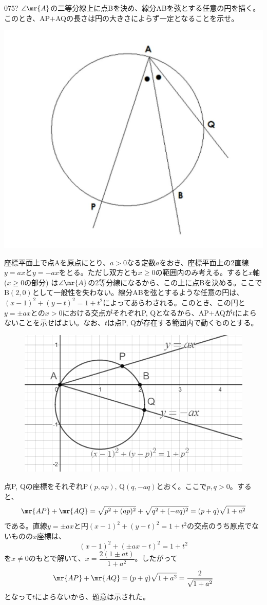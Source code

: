 \begin{thm}{075}{\hosi ?}{}
 $\angle\mr{A}$の二等分線上に点Bを決め、線分ABを弦とする任意の円を描く。このとき、AP$+$AQの長さは円の大きさによらず一定となることを示せ。
 \begin{center}
  \includegraphics[bb=0 0 1080 909,width=0.7\linewidth]{../problems/Q_075/Q_075.jpg}
 \end{center}
\end{thm}

座標平面上で点Aを原点にとり、$a>0$なる定数$a$をおき、座標平面上の2直線$y=ax$と$y=-ax$をとる。ただし双方とも$x\ge 0$の範囲内のみ考える。すると$x$軸 ($x\ge 0$の部分) は$\angle\mr{A}$の2等分線になるから、この上に点Bを決める。ここでB$(2,0)$として一般性を失わない。線分ABを弦とするような任意の円は、$(x-1)^2+(y-t)^2=1+t^2$によってあらわされる。このとき、この円と$y=\pm ax$との$x>0$における交点がそれぞれP, Qとなるから、AP$+$AQが$t$によらないことを示せばよい。なお、$t$は点P, Qが存在する範囲内で動くものとする。
\begin{figure}[H]
 \centering
 \includegraphics[width=0.7\linewidth]{../problems/Q_075/A_075.png}
\end{figure}

点P, Qの座標をそれぞれP$(p, ap)$, Q$(q, -aq)$とおく。ここで$p, q>0$。すると、
\[ \mr{AP}+\mr{AQ}=\sqrt{p^2+(ap)^2}+\sqrt{q^2+(-aq)^2}=(p+q)\sqrt{1+a^2} \]
である。直線$y=\pm ax$と円$(x-1)^2+(y-t)^2=1+t^2$の交点のうち原点でないものの$x$座標は、
\[ (x-1)^2+(\pm ax-t)^2=1+t^2 \]
を$x\neq 0$のもとで解いて、$x=\dfrac{2(1\pm at)}{1+a^2}$。したがって
\[ \mr{AP}+\mr{AQ}=(p+q)\sqrt{1+a^2}=\frac{2}{\sqrt{1+a^2}} \]
となって$t$によらないから、題意は示された。

